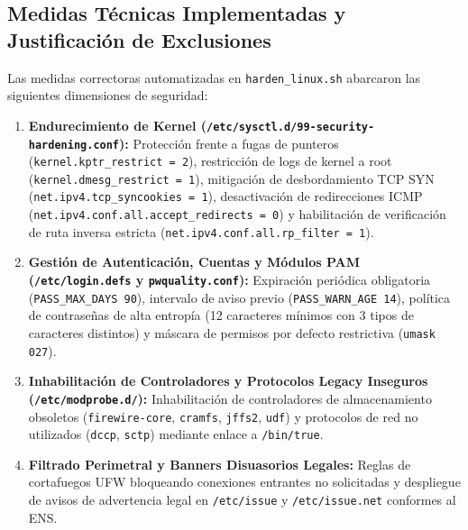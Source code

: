 \documentclass[11pt,a4paper]{article}
\begin{document}
\subsection{Medidas Técnicas Implementadas y Justificación de Exclusiones}
Las medidas correctoras automatizadas en \texttt{harden\_linux.sh} abarcaron las siguientes dimensiones de seguridad:
\begin{enumerate}[leftmargin=1.5em]
    \item \textbf{Endurecimiento de Kernel (\texttt{/etc/sysctl.d/99-security-hardening.conf}):} Protección frente a fugas de punteros (\texttt{kernel.kptr\_restrict = 2}), restricción de logs de kernel a root (\texttt{kernel.dmesg\_restrict = 1}), mitigación de desbordamiento TCP SYN (\texttt{net.ipv4.tcp\_syncookies = 1}), desactivación de redirecciones ICMP (\texttt{net.ipv4.conf.all.accept\_redirects = 0}) y habilitación de verificación de ruta inversa estricta (\texttt{net.ipv4.conf.all.rp\_filter = 1}).
    \item \textbf{Gestión de Autenticación, Cuentas y Módulos PAM (\texttt{/etc/login.defs} y \texttt{pwquality.conf}):} Expiración periódica obligatoria (\texttt{PASS\_MAX\_DAYS 90}), intervalo de aviso previo (\texttt{PASS\_WARN\_AGE 14}), política de contraseñas de alta entropía (12 caracteres mínimos con 3 tipos de caracteres distintos) y máscara de permisos por defecto restrictiva (\texttt{umask 027}).
    \item \textbf{Inhabilitación de Controladores y Protocolos Legacy Inseguros (\texttt{/etc/modprobe.d/}):} Inhabilitación de controladores de almacenamiento obsoletos (\texttt{firewire-core}, \texttt{cramfs}, \texttt{jffs2}, \texttt{udf}) y protocolos de red no utilizados (\texttt{dccp}, \texttt{sctp}) mediante enlace a \texttt{/bin/true}.
    \item \textbf{Filtrado Perimetral y Banners Disuasorios Legales:} Reglas de cortafuegos UFW bloqueando conexiones entrantes no solicitadas y despliegue de avisos de advertencia legal en \texttt{/etc/issue} y \texttt{/etc/issue.net} conformes al ENS.
\end{enumerate}
\end{document}
